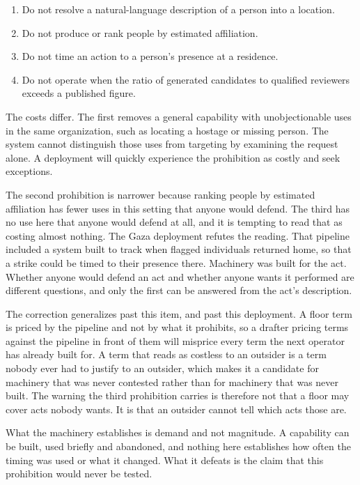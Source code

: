\begin{enumerate}
  \item Do not resolve a natural-language description of a person into a location.
  \item Do not produce or rank people by estimated affiliation.
  \item Do not time an action to a person's presence at a residence.
  \item Do not operate when the ratio of generated candidates to qualified reviewers exceeds a published figure.
\end{enumerate}

The costs differ. The first removes a general capability with unobjectionable uses in the same organization, such as locating a hostage or missing person. The system cannot distinguish those uses from targeting by examining the request alone. A deployment will quickly experience the prohibition as costly and seek exceptions.

The second prohibition is narrower because ranking people by estimated affiliation has fewer uses in this setting that anyone would defend. The third has no use here that anyone would defend at all, and it is tempting to read that as costing almost nothing. The Gaza deployment refutes the reading. That pipeline included a system built to track when flagged individuals returned home, so that a strike could be timed to their presence there. Machinery was built for the act. Whether anyone would defend an act and whether anyone wants it performed are different questions, and only the first can be answered from the act's description.

The correction generalizes past this item, and past this deployment. A floor term is priced by the pipeline and not by what it prohibits, so a drafter pricing terms against the pipeline in front of them will misprice every term the next operator has already built for. A term that reads as costless to an outsider is a term nobody ever had to justify to an outsider, which makes it a candidate for machinery that was never contested rather than for machinery that was never built. The warning the third prohibition carries is therefore not that a floor may cover acts nobody wants. It is that an outsider cannot tell which acts those are.

What the machinery establishes is demand and not magnitude. A capability can be built, used briefly and abandoned, and nothing here establishes how often the timing was used or what it changed. What it defeats is the claim that this prohibition would never be tested.

